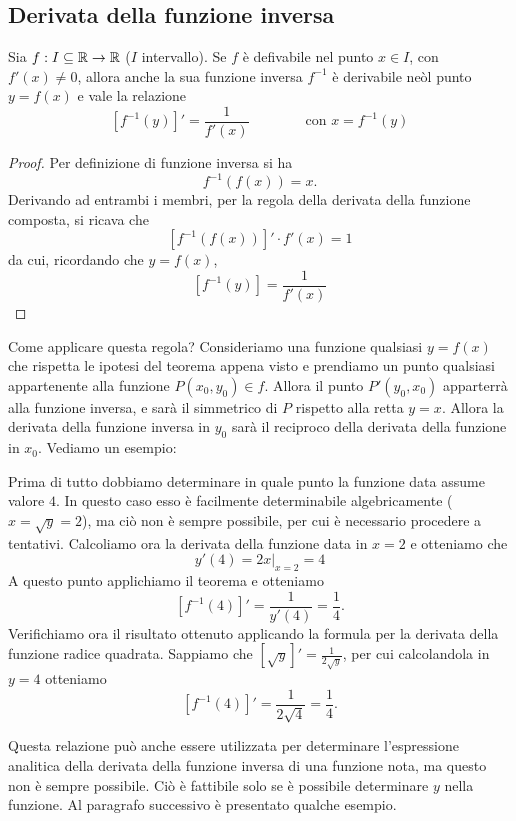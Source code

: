 \subsection{Derivata della funzione inversa}
\begin{shadedTheorem}
    Sia $f:I\subseteq \mathbb{R}\to \mathbb{R}$ ($I$ intervallo). Se $f$ è defivabile nel punto $x \in I$, con $f'(x)\neq 0$, allora anche la sua funzione inversa $f^{-1}$ è derivabile neòl punto $y=f(x)$ e vale la relazione
    \[\left[ f^{-1}(y) \right]'=\frac{1}{f'(x)}\qquad \qquad \text{con }x=f^{-1}(y)\]
\end{shadedTheorem}
\begin{proof}
    Per definizione di funzione inversa si ha
    \[f^{-1}\left( f(x) \right)=x.\]
    Derivando ad entrambi i membri, per la regola della derivata della funzione composta, si ricava che 
    \[\left[ f^{-1} \left(f(x)\right) \right]'\cdot f'(x)=1\]
    da cui, ricordando che $y=f(x)$,
    \[\left[ f^{-1} \left(y\right) \right]=\frac{1}{ f'(x)}\]
\end{proof}
Come applicare questa regola? Consideriamo una funzione qualsiasi $y=f(x)$ che rispetta le ipotesi del teorema appena visto e prendiamo un punto qualsiasi appartenente alla funzione $P(x_0,y_0)\in f$. Allora il punto $P'(y_0,x_0)$ apparterrà alla funzione inversa, e sarà il simmetrico di $P$ rispetto alla retta $y=x$. Allora la derivata della funzione inversa in $y_0$ sarà il reciproco della derivata della funzione in $x_0$.
Vediamo un esempio:
\begin{ex}
    [Calcolare la derivata della funzione inversa della funzione $y=x^2$ quando $y=4$.]
    Prima di tutto dobbiamo determinare in quale punto la funzione data assume valore $4$. In questo caso esso è facilmente determinabile algebricamente ($x=\sqrt{y}=2$), ma ciò non è sempre possibile, per cui è necessario procedere a tentativi. Calcoliamo ora la derivata della funzione data in $x=2$ e otteniamo che 
    \[y'(4)=2x\big|_{x=2}=4\]
     A questo punto applichiamo il teorema e otteniamo
    \[[f^{-1}(4)]'=\frac{1}{y'(4)}=\frac{1}{4}.\]
    Verifichiamo ora il risultato ottenuto applicando la formula per la derivata della funzione radice quadrata. Sappiamo che $\left[\sqrt{y}\right]'=\frac{1}{2\sqrt{y}}$, per cui calcolandola in $y=4$ otteniamo 
    \[[f^{-1}(4)]'=\frac{1}{2\sqrt{4}}=\frac{1}{4}.\]
\end{ex}
Questa relazione può anche essere utilizzata per determinare l'espressione analitica della derivata della funzione inversa di una funzione nota, ma questo non è sempre possibile. Ciò è fattibile solo se è possibile determinare $y$ nella funzione. Al paragrafo successivo è presentato qualche esempio.
